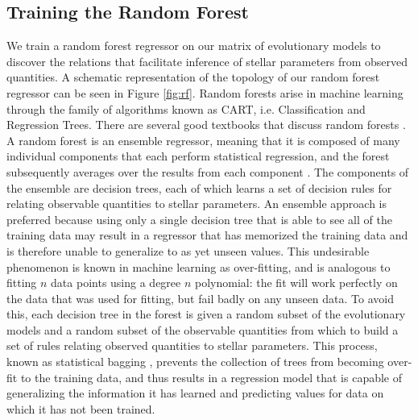 \documentclass[twocolumn,twocolappendix]{aastex6}
\newif\ifref
\newcommand{\mb}[1]{\ifref\boldmath\textbf{#1}\unboldmath\else #1\fi}
\begin{document}
\subsection{Training the Random Forest} \label{sec:forest}
We train a random forest regressor on our matrix of evolutionary models to discover the relations that facilitate inference of stellar parameters from \mb{observed} quantities. A schematic representation of the topology of our random forest regressor can be seen in Figure \ref{fig:rf}. \mb{Random forests arise in machine learning through the family of algorithms known as CART, i.e. Classification and Regression Trees.} There are several good textbooks that discuss random forests \citep[see e.g.][Chapter 15]{hastie2005elements}. \mb{A random forest is an ensemble regressor, meaning that it is composed of many individual components that each perform statistical regression, and the forest subsequently averages over the results from each component \citep{breiman2001random}. The components of the ensemble are decision trees, each of which learns a set of decision rules for relating \mb{observable quantities} to \mb{stellar parameters}. An ensemble approach is preferred because using only a single decision tree that is able to see all of the training data may result in a regressor that has memorized the training data and is therefore unable to generalize to as yet unseen values. This undesirable phenomenon is known in machine learning as over-fitting, and is analogous to fitting $n$ data points using a degree $n$ polynomial: the fit will work perfectly on the data that was used for fitting, but fail badly on any unseen data. To avoid this, each decision tree in the forest is given a random subset of the evolutionary models and a random subset of the observable quantities from which to build a set of rules relating observed quantities to stellar parameters. This process, known as statistical bagging \citep[][Section 8.7]{hastie2005elements}, prevents the collection of trees from becoming over-fit to the training data, and thus results in a regression model that is capable of generalizing the information it has learned and predicting values for data on which it has not been trained. } 
\end{document}
